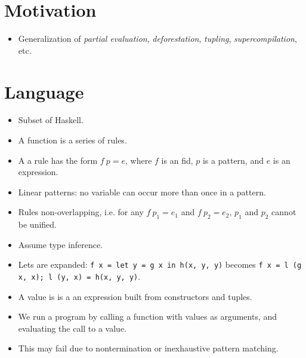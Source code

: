 \tableofcontents

\begin{description}[\setleftmargin{20pt}\setlabelstyle{\bf}\breaklabel]

\item [lol]

\end{description}

\section{Motivation}

\begin{itemize}

\item Generalization of \emph{partial evaluation}, \emph{deforestation},
\emph{tupling}, \emph{supercompilation}, etc.

\end{itemize}

\section{Language}

\begin{itemize}

\item Subset of Haskell.

\item A function is a series of rules.

\item A a rule has the form $f\ p = e$, where $f$ is an fid, $p$ is a pattern,
and $e$ is an expression.

\item Linear patterns: no variable can occur more than once in a pattern.

\item Rules non-overlapping, i.e. for any $f\ p_1 = e_1$ and $f\ p_2 = e_2$,
$p_1$ and $p_2$ cannot be unified.

\item Assume type inference.

\item Lets are expanded: \texttt{f x = let y = g x in h(x, y, y)} becomes
\texttt{f x = l (g x, x); l (y, x) = h(x, y, y)}.

\item A value is is a an expression built from constructors and tuples.

\item We run a program by calling a function with values as arguments, and
evaluating the call to a value.

\item This may fail due to nontermination or inexhaustive pattern matching.

\end{itemize}

